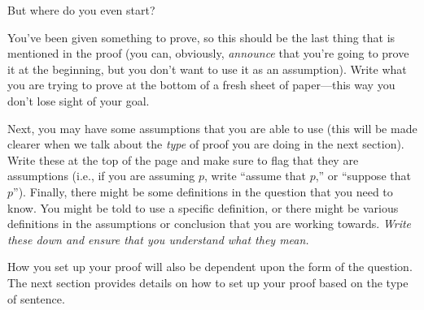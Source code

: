 \documentclass[../../../include/open-logic-section]{subfiles}
\begin{document}

But where do you even start?

You've been given something to prove, so this should be the last thing that
is mentioned in the proof (you can, obviously, \emph{announce} that you're
going to prove it at the beginning, but you don't want to use it as an
assumption). Write what you are trying to prove at the bottom of a fresh
sheet of paper---this way you don't lose sight of your goal.

Next, you may have some assumptions that you are able to use (this
will be made clearer when we talk about the \emph{type} of proof you
are doing in the next section). Write these at the top of the page and
make sure to flag that they are assumptions (i.e., if you are assuming
$p$, write ``assume that $p$,'' or ``suppose that $p$''). Finally,
there might be some definitions in the question that you need to know.
You might be told to use a specific definition, or there might be
various definitions in the assumptions or conclusion that you are
working towards. \emph{Write these down and ensure that you understand
what they mean.}

How you set up your proof will also be dependent upon the form of the
question. The next section provides details on how to set up your proof
based on the type of sentence.
\end{document}
